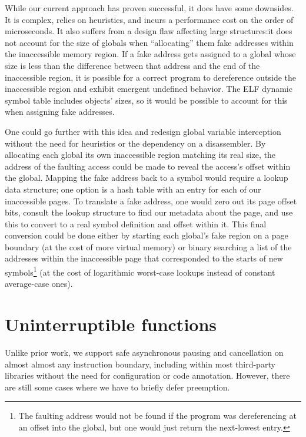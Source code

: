 While our current approach has proven successful, it does have some downsides.  It is
complex, relies on heuristics, and incurs a performance cost on the order of
microseconds.  It also suffers from a design flaw affecting large structures:\@ it
does not account for the size of globals when ``allocating'' them fake addresses
within the inaccessible memory region.  If a fake address gets assigned to a global
whose size is less than the difference between that address and the end of the
inaccessible region, it is possible for a correct program to dereference outside the
inaccessible region and exhibit emergent undefined behavior.  The ELF dynamic symbol
table includes objects' sizes, so it would be possible to account for this when
assigning fake addresses.

One could go further with this idea and redesign global variable interception without
the need for heuristics or the dependency on a disassembler.  By allocating each
global its own inaccessible region matching its real size, the address of the
faulting access could be made to reveal the access's offset within the global.
Mapping the fake address back to a symbol would require a lookup data structure; one
option is a hash table with an entry for each of our inaccessible pages.  To
translate a fake address, one would zero out its page offset bits, consult the lookup
structure to find our metadata about the page, and use this to convert to a real
symbol definition and offset within it.  This final conversion could be done either
by starting each global's fake region on a page boundary (at the cost of more virtual
memory) or binary searching a list of the addresses within the inaccessible page that
corresponded to the starts of new symbols\footnote{The faulting address would not be
found if the program was dereferencing at an offset into the global, but one would
just return the next-lowest entry.} (at the cost of logarithmic worst-case lookups
instead of constant average-case ones).


\section{Uninterruptible functions}
\label{sec:libgotcha:unint}

Unlike prior work, we support safe asynchronous pausing and cancellation on almost
almost any instruction boundary, including within most third-party libraries without
the need for configuration or code annotation.  However, there are still some cases
where we have to briefly defer preemption.

